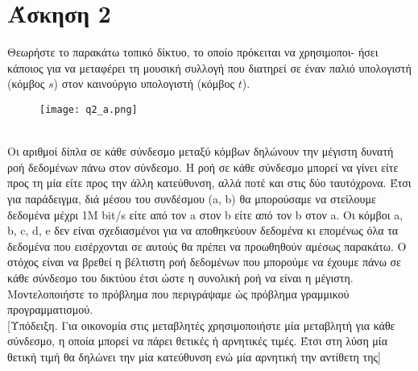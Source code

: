 \documentclass[12pt]{report}
\begin{document}
\section*{Άσκηση 2}
Θεωρήστε το παρακάτω τοπικό δίκτυο, το οποίο πρόκειται να χρησιμοποι-
ήσει κάποιος για να μεταφέρει τη μουσική συλλογή που διατηρεί σε έναν παλιό
υπολογιστή
(κόμβος $s$) στον καινούργιο υπολογιστή (κόμβος $t$).\\
\begin{figure}[h]
    \texttt{[image: q2\_a.png]}
\end{figure}
\\
Οι αριθμοί δίπλα σε κάθε σύνδεσμο μεταξύ κόμβων δηλώνουν την μέγιστη δυνατή ροή
δεδομένων πάνω στον σύνδεσμο. Η ροή σε κάθε σύνδεσμο μπορεί να γίνει είτε προς
τη μία
είτε προς την άλλη κατεύθυνση, αλλά ποτέ και στις δύο ταυτόχρονα. Έτσι για
παράδειγμα,
διά μέσου του συνδέσμου (a, b) θα μπορούσαμε να στείλουμε δεδομένα μέχρι 1M
bit/s είτε
από τον a στον b είτε από τον b στον a. Οι κόμβοι a, b, c, d, e δεν είναι
σχεδιασμένοι για να
αποθηκεύουν δεδομένα κι επομένως όλα τα δεδομένα που εισέρχονται σε αυτούς θα
πρέπει
να προωθηθούν αμέσως παρακάτω. Ο στόχος είναι να βρεθεί η βέλτιστη ροή
δεδομένων
που μπορούμε να έχουμε πάνω σε κάθε σύνδεσμο του δικτύου έτσι ώστε η συνολική
ροή
να είναι η μέγιστη. Μοντελοποιήστε το πρόβλημα που περιγράψαμε ώς πρόβλημα
γραμμικού
προγραμματισμού.\\
{[Υπόδειξη. Για οικονομία στις μεταβλητές χρησιμοποιήστε μία μεταβλητή για κάθε
        σύνδεσμο, η οποία μπορεί να πάρει θετικές ή αρνητικές τιμές. Έτσι στη λύση μία
        θετική
        τιμή θα δηλώνει την μία κατεύθυνση ενώ μία αρνητική την αντίθετη της]}
\end{document}

